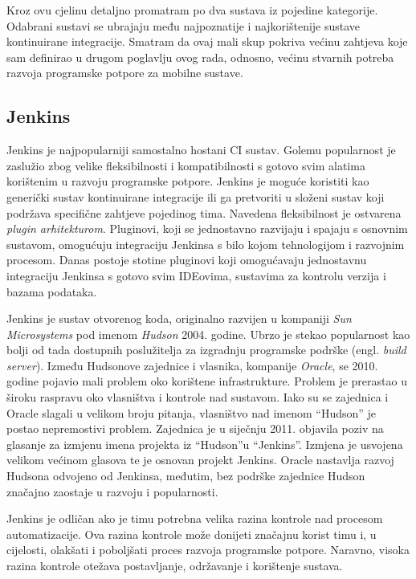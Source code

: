 \documentclass[times, utf8, diplomski, numeric]{fer}
\newcommand{\eng}[1]{(engl. \textit{#1})}
\begin{document}
\begin{appendices}
Kroz ovu cjelinu detaljno promatram po dva sustava iz pojedine kategorije. Odabrani sustavi se ubrajaju među najpoznatije i najkorištenije sustave kontinuirane integracije. Smatram da ovaj mali skup pokriva većinu zahtjeva koje sam definirao u drugom poglavlju ovog rada, odnosno, većinu stvarnih potreba razvoja programske potpore za mobilne sustave.

\subsection{Jenkins}

Jenkins je najpopularniji samostalno hostani CI sustav. Golemu popularnost je zaslužio zbog velike fleksibilnosti i kompatibilnosti s gotovo svim alatima korištenim u razvoju programske potpore. Jenkins je moguće koristiti kao generički sustav kontinuirane integracije ili ga pretvoriti u složeni sustav koji podržava specifične zahtjeve pojedinog tima. Navedena fleksibilnost je ostvarena \textit{plugin arhitekturom}. Pluginovi, koji se jednostavno razvijaju i spajaju s osnovnim sustavom, omogućuju integraciju Jenkinsa s bilo kojom tehnologijom i razvojnim procesom. Danas postoje stotine pluginovi koji omogućavaju jednostavnu integraciju Jenkinsa s gotovo svim IDEovima, sustavima za kontrolu verzija i bazama podataka\citep{wiki:Jenkins}.

Jenkins je sustav otvorenog koda, originalno razvijen u kompaniji \textit{Sun Microsystems} pod imenom \textit{Hudson}\citep{wiki:Hudson} 2004. godine. Ubrzo je stekao popularnost kao bolji od tada dostupnih poslužitelja za izgradnju programske podrške \eng{build server}. Između Hudsonove zajednice i vlasnika, kompanije \textit{Oracle}, se 2010. godine pojavio mali problem oko korištene infrastrukture. Problem je prerastao u široku raspravu oko vlasništva i kontrole nad sustavom. Iako su se zajednica i Oracle slagali u velikom broju pitanja, vlasništvo nad imenom “Hudson” je postao nepremostivi problem.  Zajednica je u siječnju 2011. objavila poziv na glasanje za izmjenu imena projekta iz “Hudson”u “Jenkins”. Izmjena je usvojena velikom većinom glasova te je osnovan projekt Jenkins. Oracle nastavlja razvoj Hudsona odvojeno od Jenkinsa, međutim, bez podrške zajednice Hudson značajno zaostaje u razvoju i popularnosti.

Jenkins je odličan ako je timu potrebna velika razina kontrole nad procesom automatizacije. Ova razina kontrole može donijeti značajnu korist timu i, u cijelosti, olakšati i poboljšati proces razvoja programske potpore. Naravno, visoka razina kontrole otežava postavljanje, održavanje i korištenje sustava.


\end{appendices}
\end{document}
